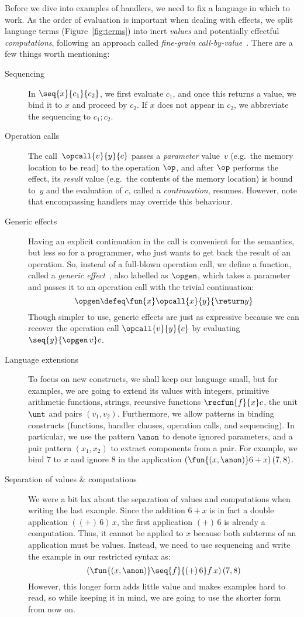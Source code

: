 Before we dive into examples of handlers, we need to fix a language in which to
work. As the order of evaluation is important when dealing with effects, we
split language terms (Figure~\ref{fig:terms}) into inert \emph{values} and
potentially effectful \emph{computations}, following an approach called
\emph{fine-grain call-by-value}~\cite{DBLP:journals/iandc/LevyPT03}. There are a few
things worth mentioning:
%
\begin{description}
\item[Sequencing]
In $\seq{x}{c_1}{c_2}$, we first evaluate $c_1$, and once this returns a value,
we bind it to $x$ and proceed by $c_2$. If $x$ does not appear in $c_2$,
we abbreviate the sequencing to $c_1; c_2$.
\item[Operation calls]
The call~$\opcall{v}{y}{c}$ passes a \emph{parameter} value~$v$
(e.g.\ the memory location to be read) to the operation $\op$, and after
$\op$ performs the effect, its \emph{result} value (e.g.\ the contents of the memory
location) is bound to~$y$ and the evaluation of $c$, called a \emph{continuation},
resumes. However, note that encompassing handlers may override this behaviour.
\item[Generic effects]
Having an explicit continuation in the call is convenient for the semantics, but
less so for a programmer, who just wants to get back the result of an
operation. So, instead of a full-blown operation call, we define a function,
called a \emph{generic effect}~\cite{DBLP:journals/acs/PlotkinP03}, also labelled
as $\opgen$, which takes a parameter and passes it to an operation call
with the trivial continuation:
\[
  \opgen \defeq \fun{x} \opcall{x}{y}{\return y}
\]
Though simpler to use, generic effects are just as expressive because we can
recover the operation call $\opcall{v}{y}{c}$ by evaluating $\seq{y}{\opgen \, v} c$.
\item[Language extensions]
To focus on new constructs, we shall keep our language small, but for examples,
we are going to extend its values with integers, primitive arithmetic functions,
strings, recursive functions $\recfun{f}{x} c$, the unit $\unt$ and pairs $(v_1,
v_2)$. Furthermore, we allow patterns in binding constructs (functions, handler
clauses, operation calls, and sequencing). In particular, we use the pattern
$\anon$ to denote ignored parameters, and a pair pattern $(x_1, x_2)$ to extract
components from a pair. For example, we bind $7$ to $x$ and ignore $8$ in the
application $(\fun{(x, \anon)} 6 + x) \, (7, 8)$.
\item[Separation of values \& computations]
We were a bit lax about the separation of values and computations when writing
the last example. Since the addition $6 + x$ is in fact a double application
$((+) \, 6) \, x$, the first application $(+) \, 6$ is already a
computation. Thus, it cannot be applied to $x$ because both subterms of an application
must be values. Instead, we need to use sequencing and write the example in our restricted syntax as:
\[
  (\fun{(x, \anon)} \seq{f}{(+) \, 6} f \, x) \, (7, 8)    
\]
However, this longer form adds little value and makes examples hard to read, so
while keeping it in mind, we are going to use the shorter form from now on.


\end{description}
